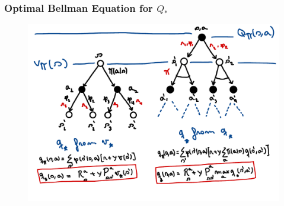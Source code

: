 \begin{frame}
    \frametitle{Optimal Bellman Equation for $Q_{*}$}
    \begin{figure}
        \centering
        \includegraphics[width=1\textwidth]{sections/markov/figures/q_star.pdf}
    \end{figure}
\end{frame}
